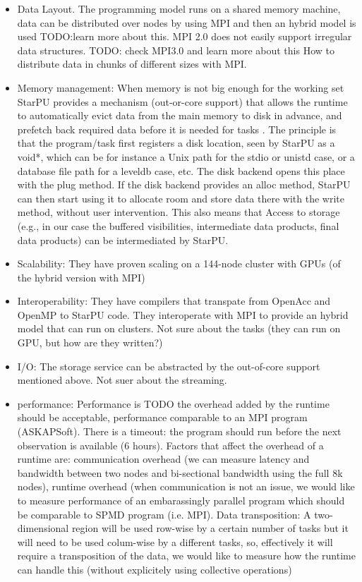 \begin{itemize}
\item Data Layout. The programming model runs on a shared memory machine, data can be distributed over nodes by using MPI and then an hybrid model is used TODO:learn more about this. MPI 2.0 does not easily support irregular data structures. TODO: check MPI3.0 and learn more about this How to distribute data in chunks of different sizes with MPI.
\item Memory management: When memory is not big enough for the working set StarPU provides a mechanism (out-or-core support) that allows the runtime to automatically evict data from the main memory to disk in advance, and prefetch back required data before it is needed for tasks . The principle is that the program/task first registers a disk location, seen by StarPU as a void*, which can be for instance a Unix path for the stdio or unistd case, or a database file path for a leveldb case, etc. The disk backend opens this place with the plug method.
If the disk backend provides an alloc method, StarPU can then start using it to allocate room and store data there with the write method, without user intervention. 
This also means that Access to storage (e.g., in our case the buffered visibilities, intermediate data products, final data products) can be intermediated by StarPU.
\item Scalability: They have proven scaling on a 144-node cluster with GPUs (of the hybrid version with MPI)
\item Interoperability: They have compilers that transpate from OpenAcc and OpenMP to StarPU code. They interoperate with MPI to provide an hybrid model that can run on clusters. Not sure about the tasks (they can run on GPU, but how are they written?) 
\item I/O: The storage service can be abstracted by the out-of-core support mentioned above. Not suer about the streaming.
\item performance: Performance is TODO { the overhead added by the runtime should be acceptable, performance comparable to an MPI program (ASKAPSoft). There is a timeout: the program should run before the next observation is available (6 hours). Factors that affect the overhead of a runtime are: communication overhead (we can measure latency and bandwidth between two nodes and bi-sectional bandwidth using the full 8k nodes), runtime overhead (when communication is not an issue, we would like to measure performance of an embarassingly parallel program which should be comparable to SPMD program (i.e. MPI). Data transposition: A two-dimensional region will be used row-wise by a certain number of tasks but it will need to be used colum-wise by a different tasks, so, effectively it will require a transposition of the data, we would like to measure how the runtime can handle this (without explicitely using collective operations)} 

\end{itemize}
